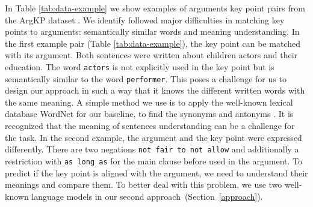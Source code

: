 In Table \ref{tab:data-example} we show examples of arguments key point pairs from the ArgKP dataset \cite{Bar-HaimEFKLS2020}. 
We identify followed major difficulties in matching key points to arguments: semantically similar words and meaning understanding.
In the first example pair (Table \ref{tab:data-example}), the key point can be matched with its argument. Both sentences were written about children actors and their education. The word \texttt{actors} is not explicitly used in the key point but is semantically similar to the word \texttt{performer}. 
This poses a challenge for us to design our approach in such a way that it knows the different written words with the same meaning. 
A simple method we use is to apply the well-known lexical database WordNet for our baseline, to find the synonyms and antonyms \cite{Miller1995}.
It is recognized that the meaning of sentences understanding can be a challenge for the task. In the second example, the argument and the key point were expressed differently. There are two negations \texttt{not fair to not allow} and additionally a restriction with \texttt{as long as} for the main clause before used in the argument. 
To predict if the key point is aligned with the argument, we need to understand their meanings and compare them. 
To better deal with this problem, we use two well-known language models in our second approach~(Section~\ref{approach}).

